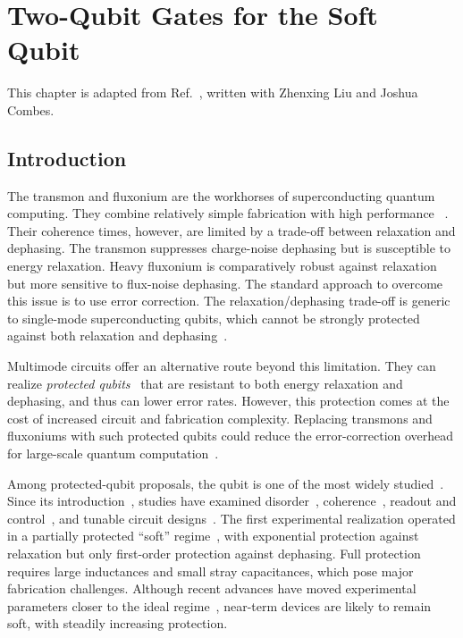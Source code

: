 
\chapter{Two-Qubit Gates for the Soft \zps Qubit}\label{chp:zp_2q_gates}

This chapter is adapted from Ref.~\cite{liu2026zp2q}, written with Zhenxing Liu and Joshua Combes.

\section{Introduction}
The transmon and fluxonium are the workhorses of superconducting quantum computing.
They combine relatively simple fabrication with high performance ~\cite{kochChargeinsensitiveQubitDesign2007b,manucharyanFluxoniumSingleCooperPair2009a,nguyen_high-coherence_2019,aruteQuantumSupremacyUsing2019a}.
Their coherence times, however, are limited by a trade-off between relaxation and dephasing.
The transmon suppresses charge-noise dephasing but is susceptible to energy relaxation.
Heavy fluxonium is comparatively robust against relaxation but more sensitive to flux-noise dephasing.
The standard approach to overcome this issue is to use error correction.
The relaxation/dephasing trade-off is generic to single-mode superconducting qubits, which cannot be strongly protected against both relaxation and dephasing~\cite{gyenisMovingTransmonNoiseProtected2021b}.

Multimode circuits offer an alternative route beyond this limitation.
They can realize \textit{protected qubits}~\cite{gyenisMovingTransmonNoiseProtected2021b} that are resistant to both energy relaxation and dephasing, and thus can lower error rates.
However, this protection comes at the cost of increased circuit and fabrication complexity.
Replacing transmons and fluxoniums with such protected qubits could reduce the error-correction overhead for large-scale quantum computation~\cite{eisert2025}.

Among protected-qubit proposals, the \zps qubit is one of the most widely studied~\cite{kitaev_protected_2006}.
Since its introduction~\cite{kitaev_protected_2006,brooks2013}, studies have examined disorder~\cite{Dempster2014understanding}, coherence~\cite{groszkowski2018}, readout and control~\cite{paolo_control_2019,Gyenis_zero_pi_2021a}, and tunable circuit designs~\cite{shenTheoreticalAnalysisProtected,smithSuperconductingCircuitProtected2020b,egusquiza2021,guo2022,rajpoot2022tunable}.
The first experimental realization operated in a partially protected ``soft'' regime~\cite{Gyenis_zero_pi_2021a}, with exponential protection against relaxation but only first-order protection against dephasing.
Full protection requires large inductances and small stray capacitances, which pose major fabrication challenges.
Although recent advances have moved experimental parameters closer to the ideal regime~\cite{KimAPS2024,kim2025protected}, near-term \zps devices are likely to remain soft, with steadily increasing protection.

